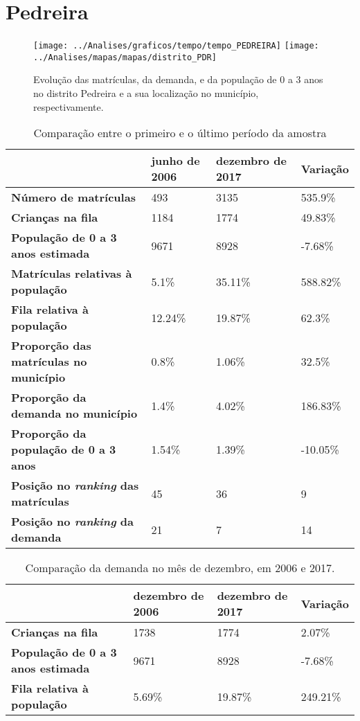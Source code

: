 \section{Pedreira}
\begin{figure}[H]
\centering
\texttt{[image: ../Analises/graficos/tempo/tempo\_PEDREIRA]}
\texttt{[image: ../Analises/mapas/mapas/distrito\_PDR]}
\caption{Evolução das matrículas, da demanda, e da população de 0 a 3 anos no distrito Pedreira e a sua localização no município, respectivamente.}
\end{figure}
\begin{table}[H]
\begin{tabular}{l|l|l|l}
\textbf{}                                      & \textbf{junho de 2006}       & \textbf{dezembro de 2017}    & \textbf{Variação} \\ \hline
\textbf{Número de matrículas}                  & 493 & 3135 & 535.9\% \\ \hline
\textbf{Crianças na fila}                      & 1184 & 1774 & 49.83\% \\ \hline
\textbf{População de 0 a 3 anos estimada}      & 9671 & 8928 & -7.68\% \\ \hline
\textbf{Matrículas relativas à população}      & 5.1\% & 35.11\% & 588.82\% \\ \hline
\textbf{Fila relativa à população}             & 12.24\% & 19.87\% & 62.3\% \\ \hline
\textbf{Proporção das matrículas no município} & 0.8\% & 1.06\% & 32.5\% \\ \hline
\textbf{Proporção da demanda no município}     & 1.4\% & 4.02\% & 186.83\% \\ \hline
\textbf{Proporção da população de 0 a 3 anos}  & 1.54\% & 1.39\% & -10.05\% \\ \hline
\textbf{Posição no \textit{ranking} das matrículas}     & 45 & 36 & 9 \\ \hline
\textbf{Posição no \textit{ranking} da demanda}         & 21 & 7 & 14 \\ 
\end{tabular}
\caption{Comparação entre o primeiro e o último período da amostra}
\end{table}
\begin{table}[H]
\begin{tabular}{l|l|l|l}
\textbf{}                                 & \textbf{dezembro de 2006} & \textbf{dezembro de 2017} & \textbf{Variação} \\ \hline
\textbf{Crianças na fila}                      & 1738 & 1774 & 2.07\% \\ \hline
\textbf{População de 0 a 3 anos estimada}      & 9671 & 8928 & -7.68\% \\ \hline
\textbf{Fila relativa à população}             & 5.69\% & 19.87\% & 249.21\% \\
\end{tabular}
\caption{Comparação da demanda no mês de dezembro, em 2006 e 2017.}
\end{table}
